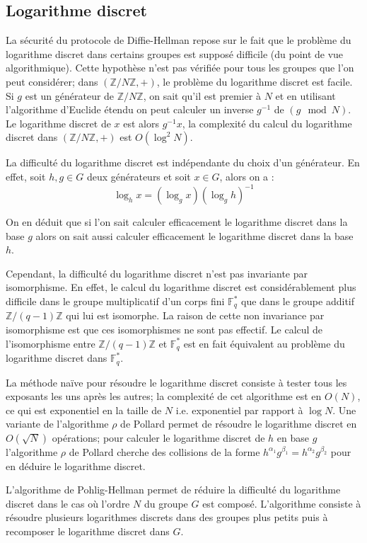\documentclass[a4paper]{article}
\theoremstyle{definition}
\theoremstyle{remark}
\numberwithin{equation}{section}
\begin{document}
\subsection{Logarithme discret}
La sécurité du protocole de Diffie-Hellman repose sur le fait que le problème du logarithme discret dans certains groupes est supposé difficile (du point de vue algorithmique). Cette hypothèse n'est pas vérifiée pour tous les groupes que l'on peut considérer; dans $(\mathbb{Z}/N\mathbb{Z},+)$, le problème du logarithme discret est facile. Si $g$ est un générateur de $\mathbb{Z}/N\mathbb{Z}$, on sait qu'il est premier à $N$ et en utilisant l'algorithme d'Euclide étendu on peut calculer un inverse $g^{-1}$ de $(g \mod N)$. Le logarithme discret de $x$ est alors $g^{-1}x$, la complexité du calcul du logarithme discret dans $(\mathbb{Z}/N\mathbb{Z},+)$ est $O(\log^2N)$.

La difficulté du logarithme discret est indépendante du choix d'un générateur. En effet, soit $h,g \in G$ deux générateurs et soit $x \in G$, alors on a :
$$\log_h x = (\log_g x)(\log_g h)^{-1}$$

On en déduit que si l'on sait calculer efficacement le logarithme discret dans la base $g$ alors on sait aussi calculer efficacement le logarithme discret dans la base $h$.

Cependant, la difficulté du logarithme discret n'est pas invariante par isomorphisme. En effet, le calcul du logarithme discret est considérablement plus difficile dans le groupe multiplicatif d'un corps fini $\mathbb{F}^*_q$ que dans le groupe additif $\mathbb{Z}/(q-1)\mathbb{Z}$ qui lui est isomorphe. La raison de cette non invariance par isomorphisme est que ces isomorphismes ne sont pas effectif. Le calcul de l'isomorphisme entre $\mathbb{Z}/(q-1)\mathbb{Z}$ et $\mathbb{F}^*_q$ est en fait équivalent au problème du logarithme discret dans $\mathbb{F}_q^*$.

La méthode naïve pour résoudre le logarithme discret consiste à tester tous les exposants les uns après les autres; la complexité de cet algorithme est en $O(N)$, ce qui est exponentiel en la taille de $N$ i.e. exponentiel par rapport à $\log N$. Une variante de l'algorithme $\rho$ de Pollard \cite{pollard} permet de résoudre le logarithme discret en $O(\sqrt{N})$ opérations; pour calculer le logarithme discret de $h$ en base $g$ l'algorithme $\rho$ de Pollard cherche des collisions de la forme $h^{\alpha_1}g^{\beta_1} = h^{\alpha_2}g^{\beta_2}$ pour en déduire le logarithme discret.

L'algorithme de Pohlig-Hellman \cite{pohlig-hellman} permet de réduire la difficulté du logarithme discret dans le cas où l'ordre $N$ du groupe $G$ est composé. L'algorithme consiste à résoudre plusieurs logarithmes discrets dans des groupes plus petits puis à recomposer le logarithme discret dans $G$.
\end{document}
